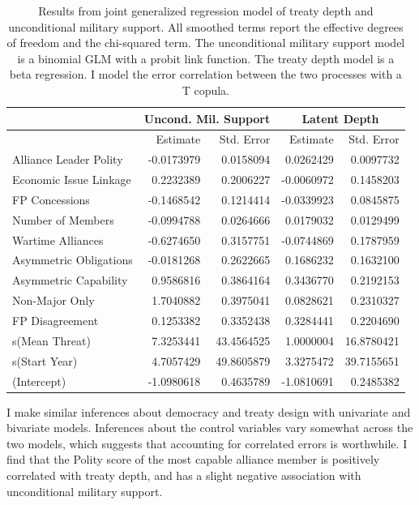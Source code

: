\documentclass[12pt]{article}
\begin{document}
\begin{table}[ht]
\centering
\begin{tabular}{lrrrr}
  & \multicolumn{2}{c}{Uncond. Mil. Support} & \multicolumn{2}{c}{Latent Depth}\\ \hline
  & Estimate & Std. Error & Estimate & Std. Error \\ 
  \hline
  Alliance Leader Polity & -0.0173979 & 0.0158094 & 0.0262429 & 0.0097732 \\ 
  Economic Issue Linkage & 0.2232389 & 0.2006227 & -0.0060972 & 0.1458203 \\ 
  FP Concessions & -0.1468542 & 0.1214414 & -0.0339923 & 0.0845875 \\ 
  Number of Members & -0.0994788 & 0.0264666 & 0.0179032 & 0.0129499 \\ 
  Wartime Alliances & -0.6274650 & 0.3157751 & -0.0744869 & 0.1787959 \\ 
  Asymmetric Obligations & -0.0181268 & 0.2622665 & 0.1686232 & 0.1632100 \\ 
  Asymmetric Capability & 0.9586816 & 0.3864164 & 0.3436770 & 0.2192153 \\ 
  Non-Major Only & 1.7040882 & 0.3975041 & 0.0828621 & 0.2310327 \\ 
  FP Disagreement & 0.1253382 & 0.3352438 & 0.3284441 & 0.2204690 \\ 
  s(Mean Threat) & 7.3253441 & 43.4564525 & 1.0000004 & 16.8780421 \\ 
  s(Start Year) & 4.7057429 & 49.8605879 & 3.3275472 & 39.7155651 \\
  (Intercept) & -1.0980618 & 0.4635789 & -1.0810691 & 0.2485382 \\  
   \hline
\end{tabular}
\caption{Results from joint generalized regression model of treaty depth and unconditional military support. 
                     All smoothed terms report the effective degrees of freedom and the chi-squared term. 
                     The unconditional military support model is a binomial GLM with a probit link function. 
                     The treaty depth model is a beta regression. 
                     I model the error correlation between the two processes with a T copula.} 
\label{tab:gjrm-res}
\end{table} 


I make similar inferences about democracy and treaty design with univariate and bivariate models.
Inferences about the control variables vary somewhat across the two models, which suggests that accounting for correlated errors is worthwhile.   
I find that the Polity score of the most capable alliance member is positively correlated with treaty depth, and has a slight negative association with unconditional military support.
\end{document}
